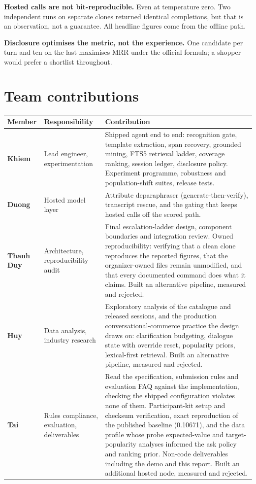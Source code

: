 \documentclass[11pt,a4paper]{article}
\begin{document}
\textbf{Hosted calls are not bit-reproducible.} Even at temperature zero. Two independent runs on separate clones returned identical completions, but that is an observation, not a guarantee. All headline figures come from the offline path.

\textbf{Disclosure optimises the metric, not the experience.} One candidate per turn and ten on the last maximises MRR under the official formula; a shopper would prefer a shortlist throughout.

\section{Team contributions}
\begin{center}\small
\begin{tabular}{@{}>{\RaggedRight\arraybackslash}p{}>{\RaggedRight\arraybackslash}p{}>{\RaggedRight\arraybackslash}p{}@{}}
\toprule \textbf{Member} & \textbf{Responsibility} & \textbf{Contribution} \\ \midrule
\textbf{Khiem} & Lead engineer, experimentation & Shipped agent end to end: recognition gate, template extraction, span recovery, grounded mining, FTS5 retrieval ladder, coverage ranking, session ledger, disclosure policy. Experiment programme, robustness and population-shift suites, release tests. \\[1.5pt]
\textbf{Duong} & Hosted model layer & Attribute deparaphraser (generate-then-verify), transcript rescue, and the gating that keeps hosted calls off the scored path. \\[1.5pt]
\textbf{Thanh Duy} & Architecture, reproducibility audit & Final escalation-ladder design, component boundaries and integration review. Owned reproducibility: verifying that a clean clone reproduces the reported figures, that the organizer-owned files remain unmodified, and that every documented command does what it claims. Built an alternative pipeline, measured and rejected. \\[1.5pt]
\textbf{Huy} & Data analysis, industry research & Exploratory analysis of the catalogue and released sessions, and the production conversational-commerce practice the design draws on: clarification budgeting, dialogue state with override reset, popularity priors, lexical-first retrieval. Built an alternative pipeline, measured and rejected. \\[1.5pt]
\textbf{Tai} & Rules compliance, evaluation, deliverables & Read the specification, submission rules and evaluation FAQ against the implementation, checking the shipped configuration violates none of them. Participant-kit setup and checksum verification, exact reproduction of the published baseline (0.10671), and the data profile whose probe expected-value and target-popularity analyses informed the ask policy and ranking prior. Non-code deliverables including the demo and this report. Built an additional hosted node, measured and rejected. \\[1.5pt]
\bottomrule\end{tabular}\end{center}
\end{document}
